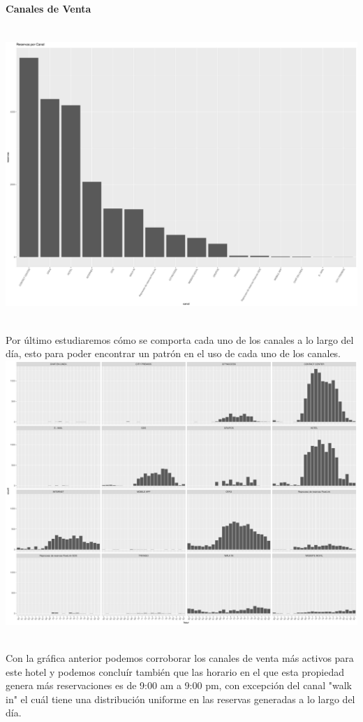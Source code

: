\documentclass{article}\usepackage[]{graphicx}\usepackage[]{color}
\makeatletter
\def\maxwidth{ %
  \ifdim\Gin@nat@width>\linewidth
    \linewidth
  \else
    \Gin@nat@width
  \fi
}
\newenvironment{knitrout}{}{} %
\makeatother
\begin{document}
\paragraph{Canales de Venta} ~\\
\begin{knitrout}
\color{fgcolor}
\includegraphics[width=\maxwidth]{figures/reservacionesxcanal-1} 

\end{knitrout}
~\\
Por último estudiaremos cómo se comporta cada uno de los canales a lo largo del día, esto para poder encontrar un patrón en el uso de cada uno de los canales.
~\\
\begin{knitrout}
\color{fgcolor}
\includegraphics[width=\maxwidth]{figures/CorrelacionHoraCanal-1} 

\end{knitrout}
~\\
Con la gráfica anterior podemos corroborar los canales de venta más activos para este hotel y podemos concluír también que las horario en el que esta propiedad genera más reservaciones es de 9:00 am a 9:00 pm, con excepción del canal "walk in" el cuál tiene una distribución uniforme en las reservas generadas a lo largo del día.
\end{document}
